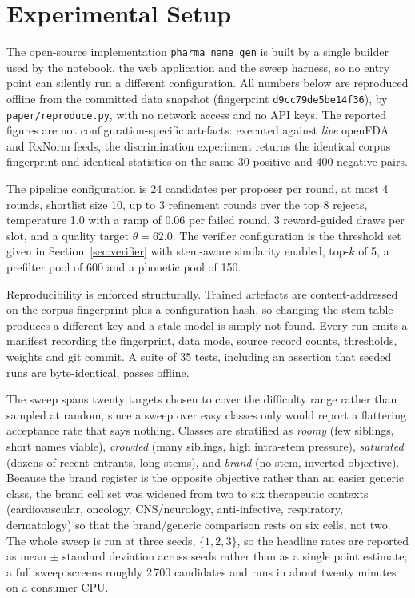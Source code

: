 \documentclass[conference]{IEEEtran}
\newcommand{\code}[1]{\texttt{\footnotesize #1}}
\begin{document}
\section{Experimental Setup}
\label{sec:setup}

The open-source implementation \code{pharma\_name\_gen} is built by a single
builder used by the notebook, the web application and the sweep harness, so no
entry point can silently run a different configuration. All numbers below are
reproduced offline from the committed data snapshot (fingerprint
\code{d9cc79de5be14f36}), by \code{paper/reproduce.py}, with no network access and
no API keys. The reported figures are not configuration-specific artefacts:
executed against \emph{live} openFDA and RxNorm feeds, the discrimination
experiment returns the identical corpus fingerprint and identical statistics on
the same 30 positive and 400 negative pairs.

The pipeline configuration is 24 candidates per proposer per round, at most 4
rounds, shortlist size 10, up to 3 refinement rounds over the top 8 rejects,
temperature 1.0 with a ramp of 0.06 per failed round, 3 reward-guided draws per
slot, and a quality target $\theta = 62.0$. The verifier configuration is the
threshold set given in Section~\ref{sec:verifier} with stem-aware similarity
enabled, top-$k$ of 5, a prefilter pool of 600 and a phonetic pool of 150.

Reproducibility is enforced structurally. Trained artefacts are
content-addressed on the corpus fingerprint plus a configuration hash, so
changing the stem table produces a different key and a stale model is simply not
found. Every run emits a manifest recording the fingerprint, data mode, source
record counts, thresholds, weights and git commit. A suite of 35 tests,
including an assertion that seeded runs are byte-identical, passes offline.

The sweep spans twenty targets chosen to cover the difficulty range rather than
sampled at random, since a sweep over easy classes only would report a
flattering acceptance rate that says nothing. Classes are stratified as
\emph{roomy} (few siblings, short names viable), \emph{crowded} (many siblings,
high intra-stem pressure), \emph{saturated} (dozens of recent entrants, long
stems), and \emph{brand} (no stem, inverted objective). Because the brand
register is the opposite objective rather than an easier generic class, the
brand cell set was widened from two to six therapeutic contexts
(cardiovascular, oncology, CNS/neurology, anti-infective, respiratory,
dermatology) so that the brand/generic comparison rests on six cells, not two.
The whole sweep is run at three seeds, $\{1,2,3\}$, so the headline rates are
reported as mean $\pm$ standard deviation across seeds rather than as a single
point estimate; a full sweep screens roughly 2\,700 candidates and runs in about
twenty minutes on a consumer CPU.
\end{document}
